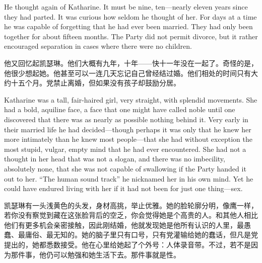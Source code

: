 \begin{paracol}{2}
He thought again of Katharine. It must be nine, ten---nearly eleven
years since they had parted. It was curious how seldom he thought of
her. For days at a time he was capable of forgetting that he had ever
been married. They had only been together for about fifteen months. The
Party did not permit divorce, but it rather encouraged separation in
cases where there were no children.

\switchcolumn

他又回忆起凯瑟琳。他们大概有九年，十年——快十一年没在一起了。奇怪的是，他很少想起她。他甚至可以一连几天忘记自己曾经结过婚。他们相处的时间只有大约十五个月。党禁止离婚，但如果没有孩子却鼓励分居。

\switchcolumn*

Katharine was a tall, fair-haired girl, very straight, with splendid
movements. She had a bold, aquiline face, a face that one might have
called noble until one discovered that there was as nearly as possible
nothing behind it. Very early in their married life he had
decided---though perhaps it was only that he knew her more intimately
than he knew most people---that she had without exception the most
stupid, vulgar, empty mind that he had ever encountered. She had not a
thought in her head that was not a slogan, and there was no imbecility,
absolutely none, that she was not capable of swallowing if the Party
handed it out to her. ``The human sound track'' he nicknamed her in his
own mind. Yet he could have endured living with her if it had not been
for just one thing---sex.

\switchcolumn

凯瑟琳有一头浅黄色的头发，身材高挑，举止优雅。她的脸轮廓分明，像鹰一样，若你没有察觉到藏在这张脸背后的空乏，你会觉得她是个高贵的人。和其他人相比他们有更多机会亲密接触，因此刚结婚，他就发现她是他所有认识的人里，最愚蠢、最庸俗、最无知的。她的脑子里只有口号，只有党灌输给她的蠢话，但凡是党提出的，她都悉数接受。他在心里给她起了个外号：人体录音带。不过，若不是因为那件事，他仍可以勉强和她生活下去。那件事就是性。

\switchcolumn*


\end{paracol}
